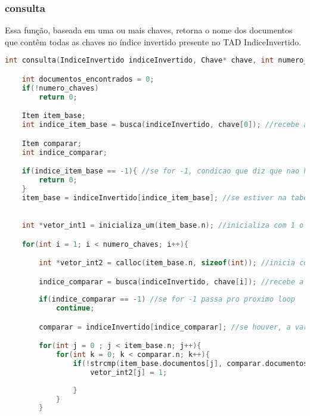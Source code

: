 \documentclass{article}
\begin{document}
\subsubsection{consulta}

Essa função, baseada em uma ou mais chaves, retorna o nome dos documentos que contêm todas as chaves no índice invertido presente no TAD IndiceInvertido.
\begin{lstlisting}[caption={Função consulta},label={lst:cod5},language=C]
int consulta(IndiceInvertido indiceInvertido, Chave* chave, int numero_chaves, NomeDocumento* nomeDocumento){

    int documentos_encontrados = 0;
    if(!numero_chaves)
        return 0;

    Item item_base;
    int indice_item_base = busca(indiceInvertido, chave[0]); //recebe a posicao da tabela que a chave se escontra

    Item comparar;
    int indice_comparar;

    if(indice_item_base == -1){ //se for -1, condicao que diz que nao ha essa chave a tabela, retorna 0
        return 0;
    }
    item_base = indiceInvertido[indice_item_base]; //se estiver na tabela, essa variavel do tipo Item recebe as informacoes presentes no indiceInvertido na posicao do indice_item_base

    
    int *vetor_int1 = inicializa_um(item_base.n); //inicializa com 1 o vetor que vai ter tamanho do numero de documentos

    for(int i = 1; i < numero_chaves; i++){

        int *vetor_int2 = calloc(item_base.n, sizeof(int)); //inicia com 0 o vetor que vai ter tamanho do numero de documentos

        indice_comparar = busca(indiceInvertido, chave[i]); //recebe a posicao em que a chave[i] esta
        
        if(indice_comparar == -1) //se for -1 passa pro proximo loop
            continue;

        comparar = indiceInvertido[indice_comparar]; //se houver, a variavel do tipo Item recebe o que tem no indiceInvertido nessa posicao

        for(int j = 0 ; j < item_base.n; j++){
            for(int k = 0; k < comparar.n; k++){
                if(!strcmp(item_base.documentos[j], comparar.documentos[k])){ //
                    vetor_int2[j] = 1;
                    
                }
            }
        }


\end{lstlisting}
\end{document}
